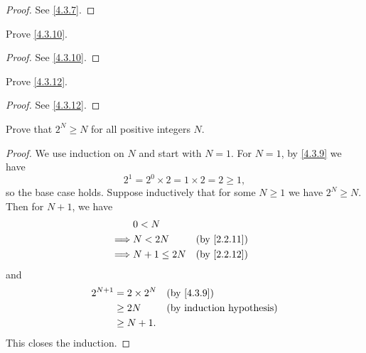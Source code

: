 \begin{proof}
  See \cref{4.3.7}.
\end{proof}

\begin{ex}\label{ex:4.3.3}
  Prove \cref{4.3.10}.
\end{ex}

\begin{proof}
  See \cref{4.3.10}.
\end{proof}

\begin{ex}
  Prove \cref{4.3.12}.
\end{ex}

\begin{proof}
  See \cref{4.3.12}.
\end{proof}

\begin{ex}\label{ex:4.3.5}
  Prove that \(2^N \geq N\) for all positive integers \(N\).
\end{ex}

\begin{proof}
  We use induction on \(N\) and start with \(N = 1\).
  For \(N = 1\), by \cref{4.3.9} we have
  \[
    2^1 = 2^0 \times 2 = 1 \times 2 = 2 \geq 1,
  \]
  so the base case holds.
  Suppose inductively that for some \(N \geq 1\) we have \(2^N \geq N\).
  Then for \(N + 1\), we have
  \begin{align*}
             & 0 < N                                        \\
    \implies & N < 2N        &  & \text{(by \cref{2.2.11})} \\
    \implies & N + 1 \leq 2N &  & \text{(by \cref{2.2.12})}
  \end{align*}
  and
  \begin{align*}
    2^{N + 1} & = 2 \times 2^N &  & \by{4.3.9} \\
              & \geq 2N        &  & \byIH      \\
              & \geq N + 1.
  \end{align*}
  This closes the induction.
\end{proof}